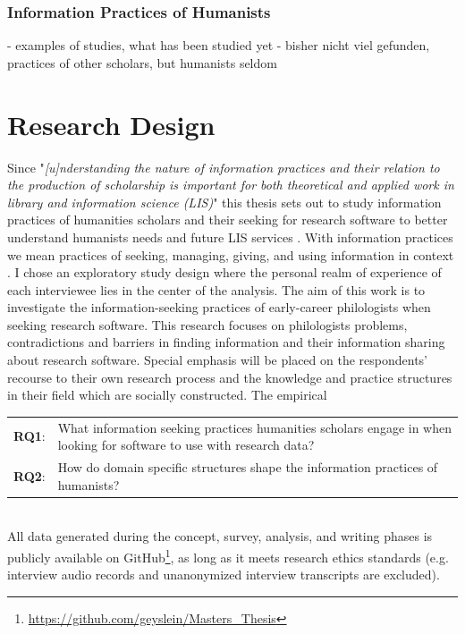 \documentclass[12pt,a4paper,titlepage,oneside,abstract=true,toc=listof,toc=bibliography]{scrreprt}
\begin{document}
\subsection{Information Practices of Humanists}
- examples of studies, what has been studied yet
- bisher nicht viel gefunden, practices of other scholars, but humanists seldom
	
\chapter{Research Design}
Since "\textit{[u]nderstanding the nature of information practices and their relation to the production of scholarship is important for both theoretical and applied work in library and information science (LIS)}" \citep[p. 165]{Palmer2009} this thesis sets out to study information practices of humanities scholars and their seeking for research software to better understand humanists needs and future LIS services \citep{Case2008, Cunningham2010}. With information practices we mean practices of seeking, managing, giving, and using information in context \citep{Palmer2009}. I chose an exploratory study design \citep{Rinsdorf2013} where the personal realm of experience of each interviewee lies in the center of the analysis. The aim of this work is to investigate the information-seeking practices of early-career philologists when seeking research software. This research focuses on philologists problems, contradictions and barriers in finding information and their information sharing about research software. Special emphasis will be placed on the respondents' recourse to their own research process and the knowledge and practice structures in their field \citep{Hjorland1995} which are socially constructed. The empirical 

\begin{tabular}{p{2cm}p{12cm}}
\textbf{RQ1}: & What information seeking practices humanities scholars engage in when looking for software to use with research data? \\ 
\textbf{RQ2}: & How do domain specific structures shape the information practices of humanists? \\ 
\end{tabular}\\  



All data generated during the concept, survey, analysis, and writing phases is publicly available on GitHub\footnote{\url{https://github.com/geyslein/Masters_Thesis}}, as long as it meets research ethics standards (e.g. interview audio records and unanonymized interview transcripts are excluded).
\end{document}
